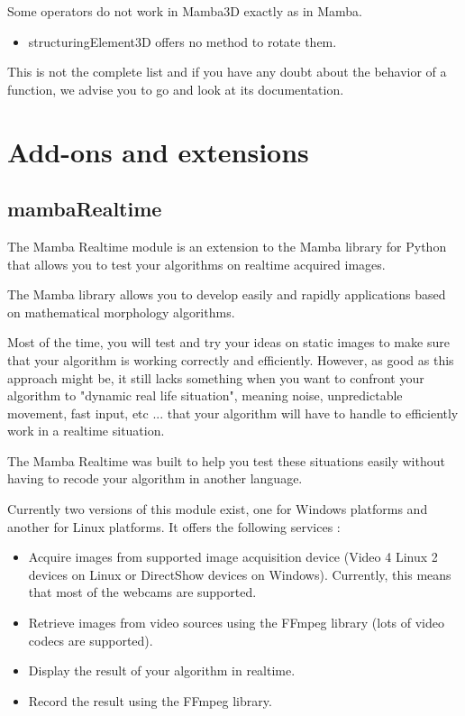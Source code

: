 \documentclass[a4paper,10pt,oneside]{article}
\begin{document}
Some operators do not work in Mamba3D exactly as in Mamba.

\begin{itemize}
\item structuringElement3D offers no method to rotate them.
\end{itemize}

This is not the complete list and if you have any doubt about the behavior
of a function, we advise you to go and look at its documentation.

\pagebreak

\section{Add-ons and extensions}
\subsection{mambaRealtime}

The Mamba Realtime module is an extension to the Mamba library for Python that 
allows you to test your algorithms on realtime acquired images.

The Mamba library allows you to develop easily and rapidly applications based on 
mathematical morphology algorithms. 

Most of the time, you will test and try your ideas on static images to make sure 
that your algorithm is working correctly and efficiently. However, as good as 
this approach might be, it still lacks something when you want to confront your 
algorithm to "dynamic real life situation", meaning noise, unpredictable 
movement, fast input, etc ... that your algorithm will have to handle to 
efficiently work in a realtime situation.

The Mamba Realtime was built to help you test these situations easily without 
having to recode your algorithm in another language.

Currently two versions of this module exist, one for Windows platforms and 
another for Linux platforms. It offers the following services :

\begin{itemize}
\item Acquire images from supported image acquisition device (Video 4 Linux 2
devices on Linux or DirectShow devices on Windows). Currently, this means that
most of the webcams are 
supported.
\item Retrieve images from video sources using the FFmpeg library (lots of video
codecs are supported).
\item Display the result of your algorithm in realtime.
\item Record the result using the FFmpeg library.
\end{itemize}
\end{document}
